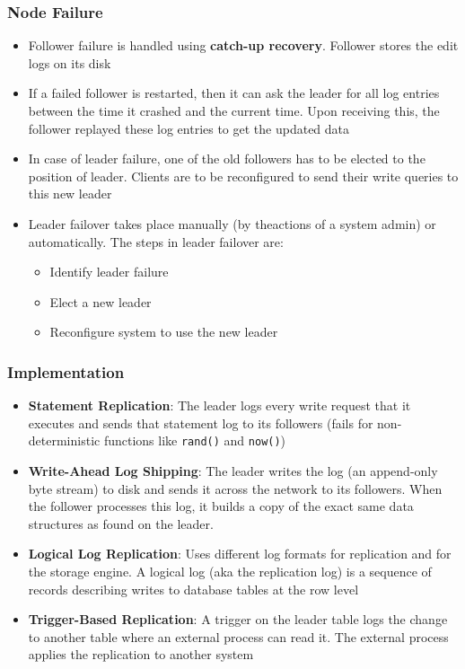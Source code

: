 \documentclass{article}
\begin{document}
\subsubsection{Node Failure}
\begin{itemize}
    \item Follower failure is handled using \textbf{catch-up recovery}. Follower stores the edit logs on its disk
    
    \item If a failed follower is restarted, then it can ask the leader for all log entries between the time it crashed and the current time. Upon receiving this, the follower replayed these log entries to get the updated data
    
    \item In case of leader failure, one of the old followers has to be elected to the position of leader. Clients are to be reconfigured to send their write queries to this new leader
    
    \item Leader failover takes place manually (by theactions of a system admin) or automatically. The steps in leader failover are:
    \begin{itemize}
        \item Identify leader failure
        
        \item Elect a new leader
        
        \item Reconfigure system to use the new leader
    \end{itemize}
\end{itemize}

\subsubsection{Implementation}
\begin{itemize}
    \item \textbf{Statement Replication}: The leader logs every write request that it executes and sends that statement log to its followers (fails for non-deterministic functions like \texttt{rand()} and \texttt{now()})
    
    \item \textbf{Write-Ahead Log Shipping}: The leader writes the log (an append-only byte stream) to disk and sends it across the network to its followers. When the follower processes this log, it builds a copy of the exact same data structures as found on the leader.
    
    \item \textbf{Logical Log Replication}: Uses different log formats for replication and for the storage engine. A logical log (aka the replication log) is a sequence of records describing writes to database tables at the row level
    
    \item \textbf{Trigger-Based Replication}: A trigger on the leader table logs the change to another table where an external process can read it. The external process applies the replication to another system
\end{itemize}
\end{document}
